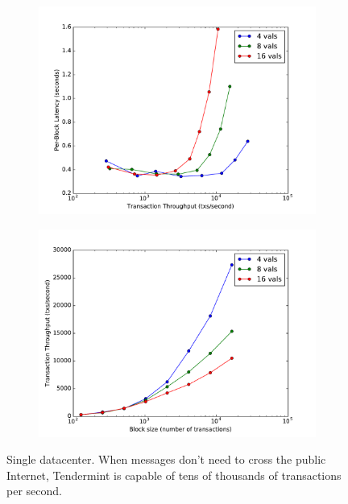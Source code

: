 \begin{figure}[]
	\centering
	\begin{subfigure}{0.8 \textwidth}
		\includegraphics[width=\linewidth,height=\textheight,keepaspectratio]{figures/throughput/single_datacenter/latency-throughput.pdf}
		\centering
	\end{subfigure}

	\begin{subfigure}{0.8 \textwidth}
		\includegraphics[width=\linewidth,height=\textheight,keepaspectratio]{figures/throughput/single_datacenter/throughput-blocksize.pdf}
	\end{subfigure}
	\caption[Latency-throughput trade-off in non-faulty local network]{Single datacenter.
When messages don't need to cross the public Internet, Tendermint is capable of tens of thousands of transactions per second.}
	\label{fig:exp:throughput:single}
\end{figure}



